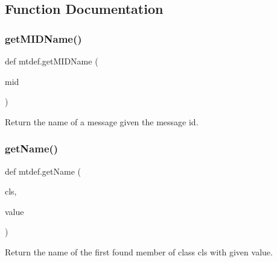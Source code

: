 \subsection{Function Documentation}
\mbox{\label{namespacemtdef_a7443ca835fd211b9840edc390448983c}} 
\subsubsection{\texorpdfstring{get\+M\+I\+D\+Name()}{getMIDName()}}
{\footnotesize\ttfamily def mtdef.\+get\+M\+I\+D\+Name (\begin{DoxyParamCaption}\item[{}]{mid }\end{DoxyParamCaption})}

\begin{DoxyVerb}Return the name of a message given the message id.\end{DoxyVerb}
 \mbox{\label{namespacemtdef_a1c9aa41c94cfc217a0cb9e4ff56a8b7d}} 
\subsubsection{\texorpdfstring{get\+Name()}{getName()}}
{\footnotesize\ttfamily def mtdef.\+get\+Name (\begin{DoxyParamCaption}\item[{}]{cls,  }\item[{}]{value }\end{DoxyParamCaption})}

\begin{DoxyVerb}Return the name of the first found member of class cls with given
value.\end{DoxyVerb}
 